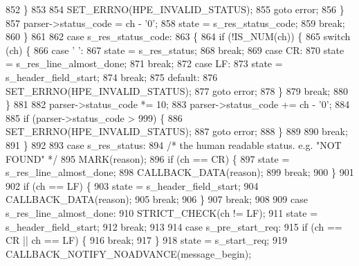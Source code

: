 \begin{DoxyCode}
852           \}
853 
854           SET_ERRNO(HPE_INVALID_STATUS);
855           \textcolor{keywordflow}{goto} error;
856         \}
857         parser->status_code = ch - \textcolor{charliteral}{'0'};
858         state = s_res_status_code;
859         \textcolor{keywordflow}{break};
860       \}
861 
862       \textcolor{keywordflow}{case} s_res_status_code:
863       \{
864         \textcolor{keywordflow}{if} (!IS_NUM(ch)) \{
865           \textcolor{keywordflow}{switch} (ch) \{
866             \textcolor{keywordflow}{case} \textcolor{charliteral}{' '}:
867               state = s_res_status;
868               \textcolor{keywordflow}{break};
869             \textcolor{keywordflow}{case} CR:
870               state = s_res_line_almost_done;
871               \textcolor{keywordflow}{break};
872             \textcolor{keywordflow}{case} LF:
873               state = s_header_field_start;
874               \textcolor{keywordflow}{break};
875             \textcolor{keywordflow}{default}:
876               SET_ERRNO(HPE_INVALID_STATUS);
877               \textcolor{keywordflow}{goto} error;
878           \}
879           \textcolor{keywordflow}{break};
880         \}
881 
882         parser->status_code *= 10;
883         parser->status_code += ch - \textcolor{charliteral}{'0'};
884 
885         \textcolor{keywordflow}{if} (parser->status_code > 999) \{
886           SET_ERRNO(HPE_INVALID_STATUS);
887           \textcolor{keywordflow}{goto} error;
888         \}
889 
890         \textcolor{keywordflow}{break};
891       \}
892 
893       \textcolor{keywordflow}{case} s_res_status:
894         \textcolor{comment}{/* the human readable status. e.g. "NOT FOUND" */}
895         MARK(reason);
896         \textcolor{keywordflow}{if} (ch == CR) \{
897           state = s_res_line_almost_done;
898           CALLBACK_DATA(reason);
899           \textcolor{keywordflow}{break};
900         \}
901 
902         \textcolor{keywordflow}{if} (ch == LF) \{
903           state = s_header_field_start;
904           CALLBACK_DATA(reason);
905           \textcolor{keywordflow}{break};
906         \}
907         \textcolor{keywordflow}{break};
908 
909       \textcolor{keywordflow}{case} s_res_line_almost_done:
910         STRICT_CHECK(ch != LF);
911         state = s_header_field_start;
912         \textcolor{keywordflow}{break};
913 
914       \textcolor{keywordflow}{case} s_pre_start_req:
915         \textcolor{keywordflow}{if} (ch == CR || ch == LF) \{
916           \textcolor{keywordflow}{break};
917         \}
918         state = s_start_req;
919         CALLBACK_NOTIFY_NOADVANCE(message\_begin);

\end{DoxyCode}
